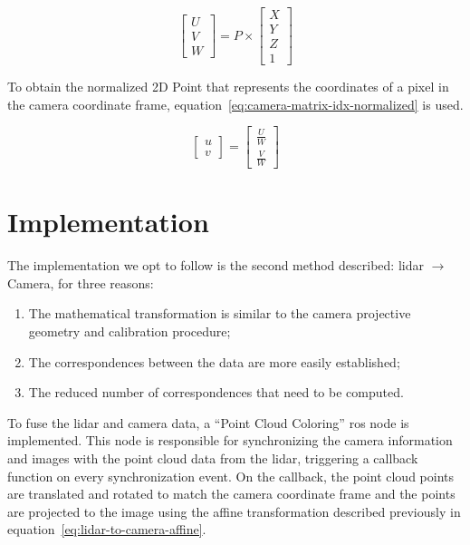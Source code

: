 \begin{equation}
	\label{eq:lidar-to-camera-affine}
		\begin{bmatrix}
			U \\
			V \\
			W
		\end{bmatrix}
		= P \times
		\begin{bmatrix}
			X \\
			Y \\
			Z \\
			1
		\end{bmatrix}
\end{equation}

To obtain the normalized 2D Point that represents the coordinates of a pixel in the camera coordinate frame, equation~\ref{eq:camera-matrix-idx-normalized} is used.

\begin{equation}
	\renewcommand\arraystretch{1.5}
	\label{eq:camera-matrix-idx-normalized}
	\begin{bmatrix}
		u \\
		v
	\end{bmatrix}
	= 
	\begin{bmatrix}
		\frac{U}{W} \\
		\frac{V}{W}
	\end{bmatrix}
\end{equation}


\section{Implementation}
\label{sec:sensor-fusion:implementation}
The implementation we opt to follow is the second method described: \ac{lidar}  $\rightarrow$ Camera, for three reasons:

\begin{enumerate}
	\item The mathematical transformation is similar to the camera projective geometry and calibration procedure;
	\item The correspondences between the data are more easily established;
	\item The reduced number of correspondences that need to be computed.
\end{enumerate}


To fuse the \ac{lidar} and camera data, a ``Point Cloud Coloring'' \ac{ros} node is implemented. This node is responsible for synchronizing the camera information and images with the point cloud data from the \ac{lidar}, triggering a callback function on every synchronization event. On the callback, the point cloud points are translated and rotated to match the camera coordinate frame and the points are projected to the image using the affine transformation described previously in equation~\ref{eq:lidar-to-camera-affine}.

